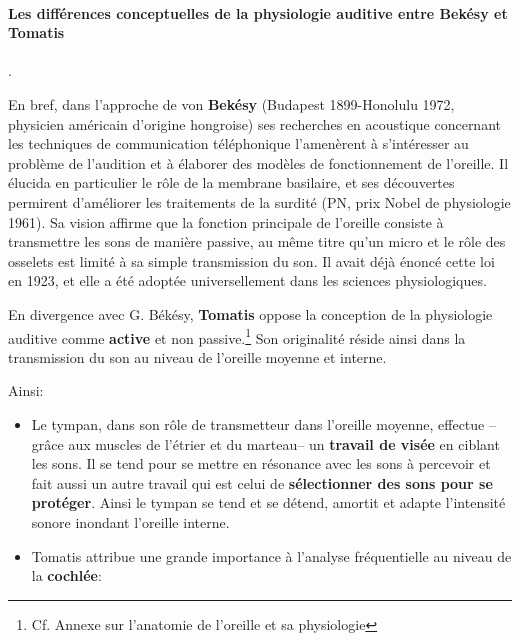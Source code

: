 \paragraph{Les différences conceptuelles de la physiologie auditive
  entre Bekésy et Tomatis}.



En bref, dans  l'approche de von\textbf{ Bekésy} (Budapest 1899-Honolulu 1972,
physicien américain d'origine hongroise) ses
recherches en acoustique concernant les techniques de communication
téléphonique l'amenèrent à s'intéresser au problème de l'audition et à
élaborer des modèles de fonctionnement de l'oreille. Il élucida en
particulier le rôle de la membrane basilaire, et ses découvertes
permirent d'améliorer les traitements de la surdité (PN, prix 
Nobel de physiologie 1961).
Sa vision affirme que la fonction principale de l'oreille
consiste à transmettre les sons de manière passive, au même titre qu'un micro et le rôle des osselets 
est limité à sa simple transmission du
son. Il avait déjà énoncé cette loi en 1923, et elle a été adoptée
universellement dans les sciences physiologiques.


En divergence avec G. Békésy, \textbf{Tomatis} oppose la conception de la 
physiologie auditive comme \textbf{active} et non passive.\footnote{Cf. Annexe sur l'anatomie de l'oreille et sa physiologie}
Son originalité réside ainsi dans la transmission du son
au niveau de l'oreille moyenne et interne.

Ainsi: 
\begin{itemize}
	\item Le tympan, dans son rôle de transmetteur dans l'oreille
          moyenne, effectue --grâce aux muscles de l'étrier et du marteau--
		un\textbf{ travail de visée} en ciblant les sons. Il 
se tend
		pour se mettre en résonance avec les sons à percevoir
                et fait aussi un autre travail qui est celui de \textbf{sélectionner des 
sons
		pour se protéger}. Ainsi le tympan se tend et se détend,
              amortit et adapte 
l'intensité
		sonore inondant  l'oreille interne. 

	\item Tomatis attribue une grande importance à l'analyse
          fréquentielle au niveau de la\textbf{ cochlée}: 
\end{itemize}








